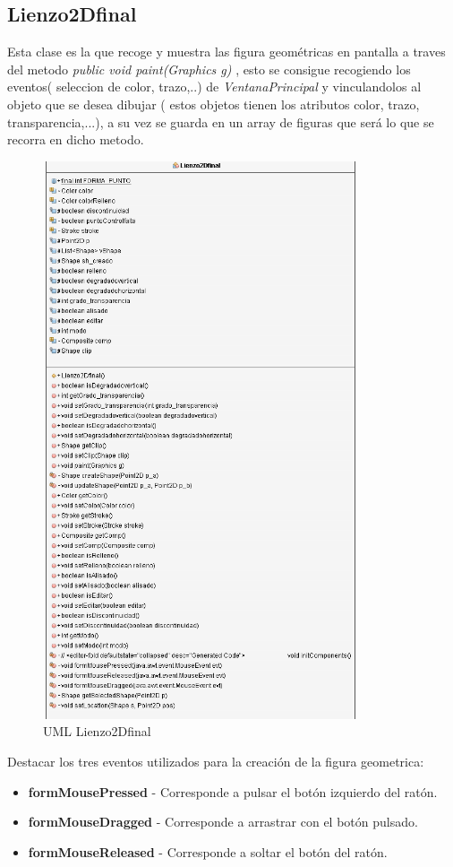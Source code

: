 \subsection{Lienzo2Dfinal} 
Esta clase es la que recoge y muestra las figura geométricas en pantalla a traves del metodo \emph{public void paint(Graphics g)} , esto se consigue recogiendo los eventos( seleccion de color, trazo,..) de \emph{VentanaPrincipal} y vinculandolos al objeto que se desea dibujar ( estos objetos tienen los atributos color, trazo, transparencia,...), a su vez se guarda en un array de figuras que será lo que se recorra en dicho metodo.
\begin{figure}[H]
  \centering
    \includegraphics[scale=0.75]{images/lienzo2dfinal}
  \caption{UML Lienzo2Dfinal}
  \label{UML Lienzo2Dfinal}
\end{figure}
Destacar los tres eventos utilizados para la creación de la figura geometrica:
\begin{itemize}
\item \textbf{formMousePressed} - Corresponde a pulsar el botón izquierdo del ratón.
\item \textbf{formMouseDragged} - Corresponde a arrastrar con el botón pulsado.
\item \textbf{formMouseReleased} - Corresponde a soltar el botón del ratón.
\end{itemize}


